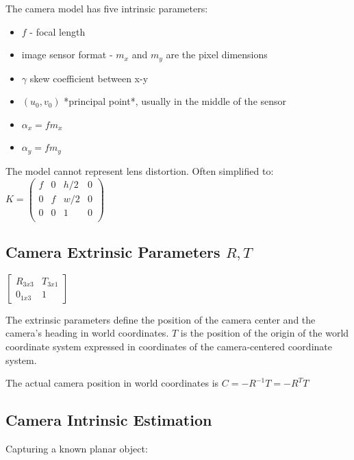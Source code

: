 The camera model has five intrinsic parameters:
\begin{itemize}
\item $f$ - focal length
\item  image sensor format - $m_x$ and $m_y$ are the pixel dimensions
\item  $\gamma$ skew coefficient between x-y
\item  $(u_0,v_0)$ *principal point*, usually in the middle of the sensor
\item  $\alpha_x = f m_x $
\item  $\alpha_y = f m_y $
\end{itemize}

The model cannot represent lens distortion. Often simplified to:
$ K = \left( \begin{matrix} 
f & 0 & h/2 & 0 \\
0 & f  & w/2 & 0 \\
0 & 0 &  1 & 0 \\
\end{matrix}
\right) $

\subsection{Camera Extrinsic Parameters $R,T$}

$ \left[ 
\begin{matrix} 
R_{3x3} & T_{3x1} \\
0_{1x3} & 1 
\end{matrix}
\right] $

The extrinsic parameters define the position of the camera center and the camera's heading in world coordinates. $T$ is the position of the origin of the world coordinate system expressed in coordinates of the camera-centered coordinate system. 

The actual camera position in world coordinates is $C = -R^{-1}T=-R^{T}T $

\subsection{Camera Intrinsic Estimation}

Capturing a known planar object:

